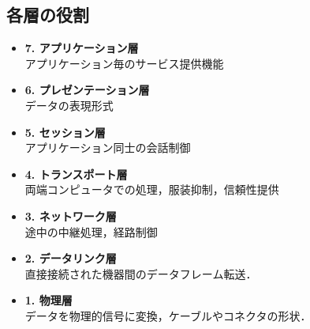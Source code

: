 \documentclass[paper=a4,10pt,twocolumn]{jlreq}
\begin{document}
\subsection*{各層の役割}
\begin{itemize}
    \item \textbf{7. アプリケーション層}\\
          アプリケーション毎のサービス提供機能
    \item \textbf{6. プレゼンテーション層}\\
          データの表現形式
    \item \textbf{5. セッション層}\\
          アプリケーション同士の会話制御
    \item \textbf{4. トランスポート層}\\
          両端コンピュータでの処理，服装抑制，信頼性提供
    \item \textbf{3. ネットワーク層}\\
          途中の中継処理，経路制御
    \item \textbf{2. データリンク層}\\
          直接接続された機器間のデータフレーム転送．
    \item \textbf{1. 物理層}\\
          データを物理的信号に変換，ケーブルやコネクタの形状．
\end{itemize}
\end{document}
